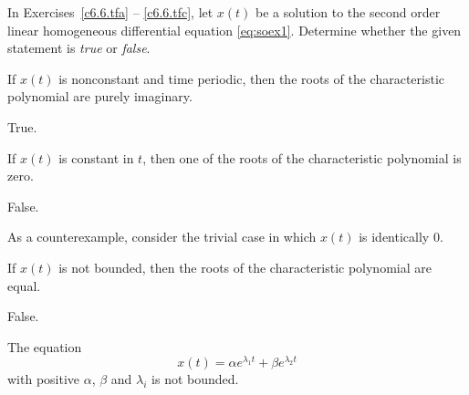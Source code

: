 \documentclass{ximera}
\begin{document}
\noindent In Exercises~\ref{c6.6.tfa} -- \ref{c6.6.tfc}, let $x(t)$ be a
solution to the second order linear homogeneous differential equation
\eqref{eq:soex1}.  Determine whether the given statement is {\em true\/}
or {\em false}.
\begin{exercise} \label{c6.6.tfa}
If $x(t)$ is nonconstant and time periodic, then the
roots of the characteristic polynomial are purely imaginary.

\begin{solution}
True.

\end{solution}
\end{exercise}
\begin{exercise} \label{c6.6.tfb}
If $x(t)$ is constant in $t$, then one of the roots of
the characteristic polynomial is zero.

\begin{solution}
\ans False.

\soln As a counterexample, consider the trivial case in which $x(t)$
is identically $0$.

\end{solution}
\end{exercise}
\begin{exercise} \label{c6.6.tfc}
If $x(t)$ is not bounded, then the roots of the characteristic
polynomial are equal.

\begin{solution}
\ans False.

\soln The equation
\[
x(t) = \alpha e^{\lambda_1 t} + \beta e^{\lambda_2 t}
\]
with positive $\alpha$, $\beta$ and $\lambda_i$ is not bounded.

\end{solution}
\end{exercise}
\end{document}
